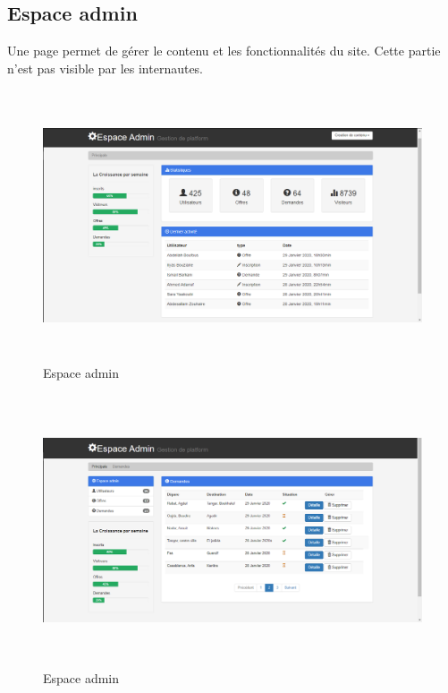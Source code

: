 \documentclass[a4paper]{report}
\begin{document}
\begin{spacing}{2}
\subsection{Espace admin}
Une page permet de gérer le contenu et les fonctionnalités du site. Cette partie n'est pas visible par les internautes.
\begin{figure}[!ht]
\begin{center}
\includegraphics[height=8cm]{admin1.png}
\end{center}
\caption[Espace admin]{Espace admin}
\end{figure}
\begin{figure}[!ht]
\begin{center}
\includegraphics[height=8cm]{admin_demandes.png}
\end{center}
\caption[Espace admin]{Espace admin}
\end{figure}
\begin{figure}[!ht]
\begin{center}

\end{center}
\end{figure}
\end{spacing}
\end{document}
